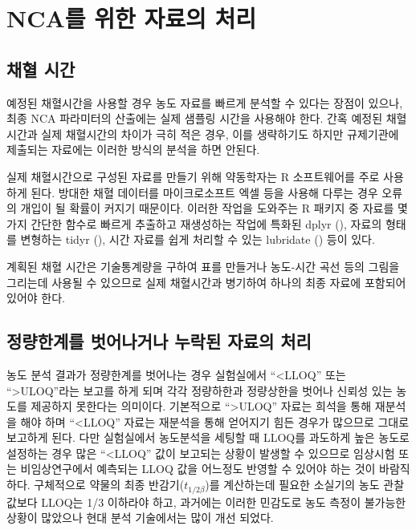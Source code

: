 \documentclass[
  11pt,
  krantz2, a4paper, twoside]{krantz}
\theoremstyle{definition}
\theoremstyle{definition}
\theoremstyle{definition}
\theoremstyle{definition}
\theoremstyle{remark}
\begin{document}
\section{NCA를 위한 자료의 처리}\label{data-prep}

\subsection{채혈 시간}\label{uxcc44uxd608-uxc2dcuxac04}

예정된 채혈시간을 사용할 경우 농도 자료를 빠르게 분석할 수 있다는 장점이 있으나, 최종 NCA 파라미터의 산출에는 실제 샘플링 시간을 사용해야 한다. 간혹 예정된 채혈시간과 실제 채혈시간의 차이가 극히 적은 경우, 이를 생략하기도 하지만 규제기관에 제출되는 자료에는 이러한 방식의 분석을 하면 안된다.

실제 채혈시간으로 구성된 자료를 만들기 위해 약동학자는 R 소프트웨어를 주로 사용하게 된다. 방대한 채혈 데이터를 마이크로소프트 엑셀 등을 사용해 다루는 경우 오류의 개입이 될 확률이 커지기 때문이다. 이러한 작업을 도와주는 R 패키지 중 자료를 몇가지 간단한 함수로 빠르게 추출하고 재생성하는 작업에 특화된 dplyr (), 자료의 형태를 변형하는 tidyr (), 시간 자료를 쉽게 처리할 수 있는 lubridate () 등이 있다. 

계획된 채혈 시간은 기술통계량을 구하여 표를 만들거나 농도-시간 곡선 등의 그림을 그리는데 사용될 수 있으므로 실제 채혈시간과 병기하여 하나의 최종 자료에 포함되어 있어야 한다.

\subsection{정량한계를 벗어나거나 누락된 자료의 처리}\label{uxc815uxb7c9uxd55cuxacc4uxb97c-uxbc97uxc5b4uxb098uxac70uxb098-uxb204uxb77duxb41c-uxc790uxb8ccuxc758-uxcc98uxb9ac}

농도 분석 결과가 정량한계를 벗어나는 경우 실험실에서 ``\textless LLOQ'' 또는 ``\textgreater ULOQ''라는 보고를 하게 되며 각각 정량하한과 정량상한을 벗어나 신뢰성 있는 농도를 제공하지 못한다는 의미이다. 기본적으로 ``\textgreater ULOQ'' 자료는 희석을 통해 재분석을 해야 하며 ``\textless LLOQ'' 자료는 재분석을 통해 얻어지기 힘든 경우가 많으므로 그대로 보고하게 된다. 다만 실험실에서 농도분석을 세팅할 때 LLOQ를 과도하게 높은 농도로 설정하는 경우 많은 ``\textless LLOQ'' 값이 보고되는 상황이 발생할 수 있으므로 임상시험 또는 비임상연구에서 예측되는 LLOQ 값을 어느정도 반영할 수 있어야 하는 것이 바람직하다. 구체적으로 약물의 최종 반감기(\(t_{1/2\beta}\))를 계산하는데 필요한 소실기의 농도 관찰값보다 LLOQ는 1/3 이하라야 하고, 과거에는 이러한 민감도로 농도 측정이 불가능한 상황이 많았으나 현대 분석 기술에서는 많이 개선 되었다.
\end{document}
